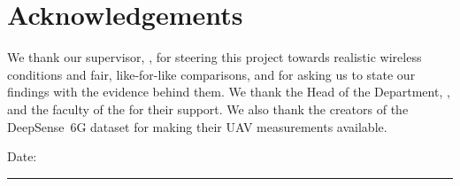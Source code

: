 \chapter*{Acknowledgements}

We thank our supervisor, \Supervisor, for steering this project towards realistic
wireless conditions and fair, like-for-like comparisons, and for asking us to state
our findings with the evidence behind them. We thank the Head of the Department,
\HOD, and the faculty of the \Department{} for their support. We also thank the
creators of the DeepSense~6G dataset for making their UAV measurements available.

\vspace{18mm}
\noindent
{\renewcommand{\Student}[2]{%
  \begin{minipage}[t]{0.32\textwidth}\centering
  \rule{40mm}{0.4pt}\\#1\\#2
  \end{minipage}\hfill}%
\StudentList}

\vspace{10mm}
\noindent Date: \rule{40mm}{0.4pt}

